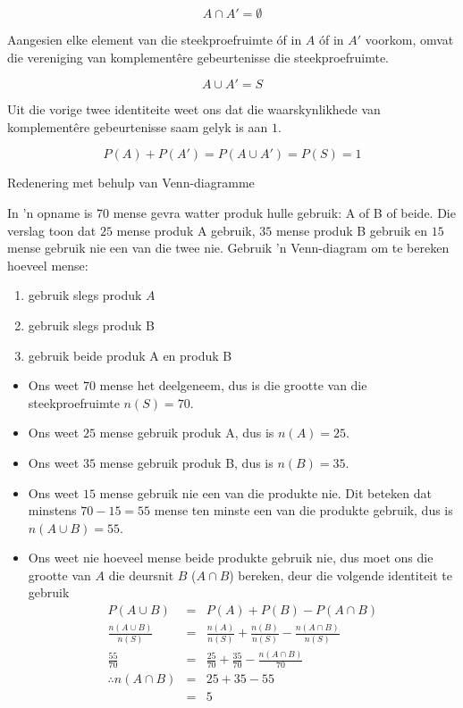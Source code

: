   \[A \cap A' = \emptyset\]


Aangesien elke element van die steekproefruimte óf in $A$ óf in $A'$ voorkom, omvat die vereniging van komplement\^ere gebeurtenisse die steekproefruimte.

  \[A \cup A' = S\]


Uit die vorige twee identiteite weet ons dat die waarskynlikhede van komplement\^ere gebeurtenisse saam gelyk is aan $1$.


  \[P(A) + P(A') = P(A \cup A') = P(S) = 1\]


\clearpage
\begin{wex}{Redenering met behulp van Venn-diagramme}{
\begin{minipage}{\textwidth}
  In 'n opname is $70$ mense gevra watter produk hulle gebruik: A of B of beide. Die verslag toon dat $25$ mense produk A gebruik, $35$ mense produk B gebruik en $15$ mense gebruik nie een van die twee nie. Gebruik 'n Venn-diagram om te bereken hoeveel mense:
  \begin{enumerate}[itemsep=3pt, label=\textbf{\arabic*}.]
\item gebruik slegs produk $A$
  \item gebruik slegs produk B
  \item gebruik beide produk A en produk B
  \end{enumerate}
\end{minipage}
}{
\begin{minipage}{\textwidth}
  \begin{itemize}[noitemsep]
  \item Ons weet $70$ mense het deelgeneem, dus is die grootte van die steekproefruimte $n(S) = 70$.
  \item Ons weet $25$ mense gebruik produk A, dus is $n(A) = 25$.
  \item Ons weet $35$ mense gebruik produk B, dus is $n(B) = 35$.
  \item Ons weet $15$ mense gebruik nie een van die produkte nie. Dit beteken dat minstens $70-15=55$ mense ten minste een van die produkte gebruik, dus is 
    $n(A \cup B) = 55$.
  \item Ons weet nie hoeveel mense beide produkte gebruik nie, dus moet ons die grootte van $A$ die deursnit $B$ ($A \cap B$) bereken, deur die volgende identiteit te gebruik
    \begin{eqnarray*}
      P(A \cup B) & = & P(A) + P(B) - P(A \cap B) \\
      \frac{n(A \cup B)}{n(S)} & = & \frac{n(A)}{n(S)} + \frac{n(B)}{n(S)} - \frac{n(A \cap B)}{n(S)} \\
      \frac{55}{70} & = & \frac{25}{70} + \frac{35}{70} - \frac{n(A \cap B)}{70} \\
      \therefore n(A \cap B) & = & 25 + 35 - 55 \\
      & = & 5
    \end{eqnarray*}
  \end{itemize}


\end{minipage}}
\end{wex}
